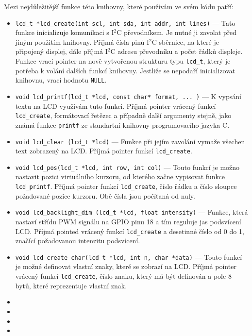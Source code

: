 Mezi nejdůležitější funkce této knihovny, které používám ve svém kódu patří:
\begin{itemize}
  \item \texttt{lcd_t *lcd_create(int scl, int sda, int addr, int lines)} --- Tato funkce inicializuje komunikaci s I$^{2}$C převodníkem. Je nutné ji zavolat před jiným použitím knihovny. Příjmá čísla pinů I$^{2}$C sběrnice, na které je připojený displej, dále příjmá I$^{2}$C adresu převodníku a počet řádků displeje. Funkce vrací pointer na nově vytvořenou strukturu typu \texttt{lcd_t}, který je potřeba k volání dalších funkcí knihovny. Jestliže se nepodaří inicializovat knihovnu, vrací hodnotu \texttt{NULL}.
  \item \texttt{void lcd_printf(lcd_t *lcd, const char* format, ... )} --- K vypsání textu na LCD využívám tuto funkci. Příjmá pointer vrácený funkcí \texttt{lcd_create}, formátovací řetězec a případně další argumenty stejně, jako známá funkce \texttt{printf} ze standartní knihovny programovacího jazyka C.
  \item \texttt{void lcd_clear (lcd_t *lcd)} --- Funkce při jejím zavolání vymaže všechen text zobrazený na LCD. Příjmá pointer funkcí \texttt{lcd_create}.
  \item \texttt{void lcd_pos(lcd_t *lcd, int row, int col)} --- Touto funkcí je možno nastavit pozici virtuálního kurzoru, od kterého začne vypisovat funkce \texttt{lcd_printf}. Příjmá  pointer funkcí \texttt{lcd_create}, číslo řádku a číslo sloupce požadované pozice kurzoru. Obě čísla jsou počítaná od nuly.
  \item \texttt{void lcd_backlight_dim (lcd_t *lcd, float intensity)} --- Funkce, která nastaví střídu PWM signálu na GPIO pinu 18 a tím reguluje jas podsvícení LCD. Příjmá pointed vrácený funkcí \texttt{lcd_create} a desetinné číslo od 0 do 1, značící požadovanou intenzitu podsvícení.
  \item \texttt{void lcd_create_char(lcd_t *lcd, int n, char *data)} --- Touto funkcí je možné definovat vlastní znaky, které se zobrazí na LCD. Příjmá pointer vrácený funkcí \texttt{lcd_create}, číslo znaku, který má být definován a pole 8 bytů, které reprezentuje vlastní znak.
  \item \texttt{}
  \item \texttt{}
  \item \texttt{}
  \item \texttt{}
\end{itemize}

